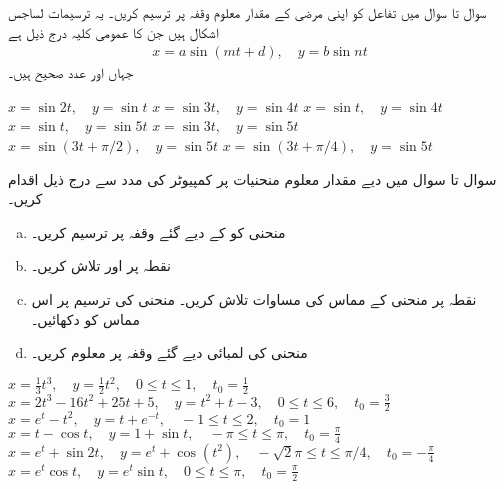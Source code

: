 سوال  تا سوال  میں تفاعل کو اپنی مرضی کے مقدار معلوم وقفہ پر ترسیم کریں۔ یہ ترسیمات لساجس اشکال ہیں جن کا عمومی کلیہ درج ذیل ہے
\begin{align*}
x=a\sin(mt+d),\quad y=b\sin nt
\end{align*}
جہاں  اور  عدد صحیح ہیں۔

$x=\sin 2t,\quad y=\sin t$
$x=\sin 3t,\quad y=\sin 4t$
$x=\sin t,\quad y=\sin 4t$
$x=\sin t,\quad y=\sin 5t$
$x=\sin 3t,\quad y=\sin 5t$
$x=\sin (3t+\pi/2),\quad y=\sin 5t$
$x=\sin (3t+\pi/4),\quad y=\sin 5t$

سوال  تا سوال  میں دیے مقدار معلوم منحنیات پر کمپیوٹر کی مدد سے درج ذیل اقدام کریں۔
\begin{enumerate}[a.]
\item
منحنی کو   کے دیے گئے وقفہ پر ترسیم کریں۔ 
\item
نقطہ  پر  اور  تلاش کریں۔
\item
نقطہ  پر منحنی کے مماس کی مساوات تلاش کریں۔ منحنی کی ترسیم پر اس مماس کو دکھائیں۔ 
\item
منحنی کی لمبائی دیے گئے وقفہ پر معلوم کریں۔
\end{enumerate}

 $x=\frac{1}{3}t^3,\quad y=\frac{1}{2}t^2,\quad 0\le t\le 1,\quad t_0=\frac{1}{2}$
 $x=2t^3-16t^2+25t+5,\quad y=t^2+t-3,\quad 0\le t\le 6,\quad t_0=\frac{3}{2}$
 $x=e^t-t^2,\quad y=t+e^{-t},\quad -1\le t\le 2,\quad t_0=1$
 $x=t-\cos t,\quad y=1+\sin t,\quad -\pi\le t\le \pi,\quad t_0=\frac{\pi}{4}$
 $x=e^t+\sin 2t,\quad y=e^t+\cos(t^2),\quad -\sqrt{2}\pi\le t\le \pi/4,\quad t_0=-\frac{\pi}{4}$
 $x=e^t\cos t,\quad y=e^t\sin t,\quad 0\le t\le \pi,\quad t_0=\frac{\pi}{2}$

